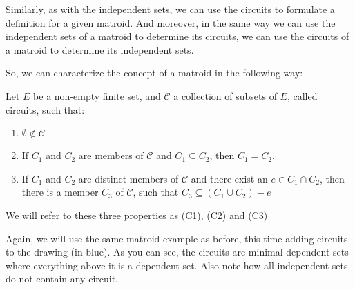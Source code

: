 Similarly, as with the independent sets, we can use the circuits to formulate a definition for a given matroid. And moreover, in the same way we can use the independent sets of a matroid to determine its circuits, we can use the circuits of a matroid to determine its independent sets.

So, we can characterize the concept of a matroid in the following way:

\begin{defn}
    Let $E$ be a non-empty finite set, and $\mathcal{C}$ a collection of subsets of $E$, called circuits, such that:

    \begin{enumerate}
        \item $\emptyset \notin \mathcal{C}$

        \item If $C_1$ and $C_2$ are members of $\mathcal{C}$ and $C_1 \subseteq C_2$, then $C_1 = C_2$.

        \item If $C_1$ and $C_2$ are distinct members of $\mathcal{C}$ and there exist an $e \in C_1 \cap C_2$, then there is a member $C_3$ of $\mathcal{C}$, such that $C_3 \subseteq (C_1  \cup C_2) - e$
    \end{enumerate}
    We will refer to these three properties as (C1), (C2) and (C3)
    
\end{defn}

Again, we will use the same matroid example as before, this time adding circuits to the drawing (in blue). As you can see, the circuits are minimal dependent sets where everything above it is a dependent set. Also note how all independent sets do not contain any circuit.

